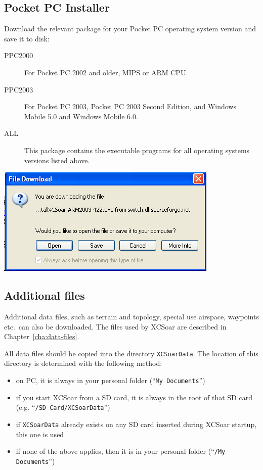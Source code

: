 \documentclass[a4paper,12pt]{refrep}
\begin{document}
\subsection*{Pocket PC Installer}
Download the relevant package for your Pocket PC operating system
version and save it to disk:
\begin{description}
\item[PPC2000] For Pocket PC 2002 and older, MIPS or ARM CPU.
\item[PPC2003] For Pocket PC 2003, Pocket PC 2003 Second Edition, 
  and Windows Mobile 5.0 and Windows Mobile 6.0.
\item[ALL] This package contains the executable programs for all
 operating systems versions listed above.
\end{description}

\begin{center}
\includegraphics[angle=0,width=\linewidth,keepaspectratio='true']{figures/XCS_Download.png}
\end{center}


\subsection*{Additional files}

Additional data files, such as terrain and topology, special use
airspace, waypoints etc.\ can also be downloaded.  The files used by
XCSoar are described in Chapter~\ref{cha:data-files}.

All data files should be copied into the directory
\texttt{XCSoarData}.  The location of this directory is determined
with the following method:

\begin{itemize}
\item on PC, it is always in your personal folder (``\texttt{My
  Documents}'')
\item if you start XCSoar from a SD card, it is always in the root of
  that SD card (e.g. ``\texttt{/SD Card/XCSoarData}'')
\item if \texttt{XCSoarData} already exists on any SD card inserted
  during XCSoar startup, this one is used
\item if none of the above applies, then it is in your personal folder
  (``\texttt{/My Documents}'')
\end{itemize}
\end{document}
